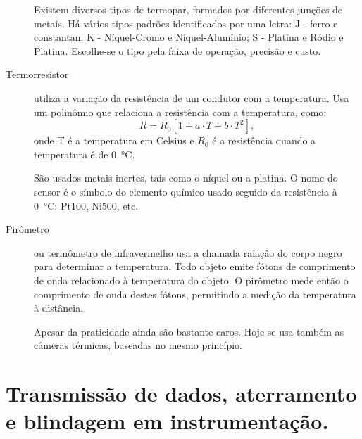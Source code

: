 \begin{description}
Existem diversos tipos de termopar, formados por diferentes junções de metais. Há vários tipos padrões identificados por uma letra: J - ferro e constantan; K - Níquel-Cromo e Níquel-Alumínio; S - Platina e Ródio e Platina. Escolhe-se o tipo pela faixa de operação, precisão e custo.

  \item[Termorresistor] utiliza a variação da resistência de um condutor com a temperatura. Usa um polinômio que relaciona a resistência com a temperatura, como:
  \[
R = R_0[1+a\cdot T+b\cdot T^2],
  \]
onde T é a temperatura em Celsius e $R_0$ é a resistência quando a temperatura é de \SI{0}{\celsius}.

São usados metais inertes, tais como o níquel ou a platina. O nome do sensor é o símbolo do elemento químico usado seguido da resistência à \SI{0}{\celsius}: Pt100, Ni500, etc.
  \item[Pirômetro] ou termômetro de infravermelho usa a chamada raiação do corpo negro para determinar a temperatura. Todo objeto emite fótons de comprimento de onda relacionado à temperatura do objeto. O pirômetro mede então o comprimento de onda destes fótons, permitindo a medição da temperatura à distância.

  Apesar da praticidade ainda são bastante caros. Hoje se usa também as câmeras térmicas, baseadas no mesmo princípio.
\end{description}

\section{Transmissão de dados, aterramento e blindagem em instrumentação.}
